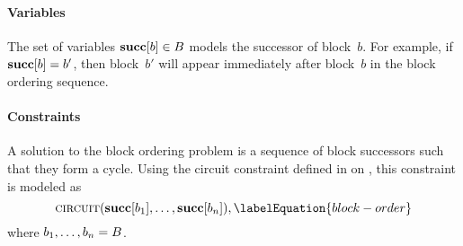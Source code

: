 \paragraph{Variables}

The set of \glspl{variable} \mbox{$\mVar{succ}[b] \in \mBlockSet$} models the
successor of block~$b$\hspace{-.5pt}.
%
For example, if \mbox{$\mVar{succ}[b] = b'$}, then \gls{block}~$b'$ will appear
immediately after \gls{block}~$b$ in the \gls{block ordering} sequence.


\paragraph{Constraints}

A \gls{solution} to the \gls{block ordering} problem is a sequence of
\gls{block} successors such that they form a \gls{cycle}.
%
Using the \gls{circuit constraint} defined in
 on , this
\gls{constraint} is modeled as
%
\begin{equation}
  \mCircuit(\mVar{succ}[b_1], \ldots, \mVar{succ}[b_n]),
  \labelEquation{block-order}
\end{equation}
%
where \mbox{$b_1, \ldots, b_n = B$}.

